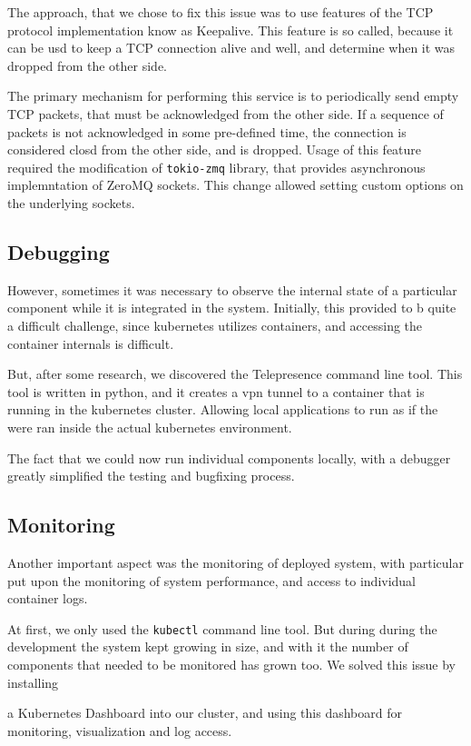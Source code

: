 The approach, that we chose to fix this issue was to use features of the TCP protocol implementation know as Keepalive.
This feature is so called, because it can be usd to keep a TCP connection alive and well, and determine when it was dropped from the other side.

The primary mechanism for performing this service is to periodically send empty TCP packets, that must be acknowledged from
the other side. If a sequence of packets is not acknowledged in some pre-defined time, the connection is considered closd
from the other side, and is dropped. Usage of this feature required the modification of \verb|tokio-zmq| library, that provides asynchronous implemntation
of ZeroMQ sockets. This change allowed setting custom options on the underlying sockets.


\subsection{Debugging}
However, sometimes it was necessary to observe the internal state of a particular component while it is integrated in the system.
Initially, this provided to b quite a difficult challenge, since kubernetes utilizes containers, and accessing the container
internals is difficult.

But, after some research, we discovered the Telepresence command line tool. This tool is written in python,
and it creates a vpn tunnel to a container that is running in the kubernetes cluster. Allowing local applications to run as if
the were ran inside the actual kubernetes environment.

The fact that we could now run individual components locally, with a debugger greatly simplified the testing and bugfixing process.

\subsection{Monitoring}
Another important aspect was the monitoring of deployed system, with particular  put upon
the monitoring of system performance, and access to individual container logs.

At first, we only used the \verb|kubectl| command line tool. But during during the development the system kept growing
in size, and with it the number of components that needed to be monitored has grown too. We solved this issue by installing

a Kubernetes Dashboard into our cluster, and using this dashboard for monitoring, visualization and log access.


